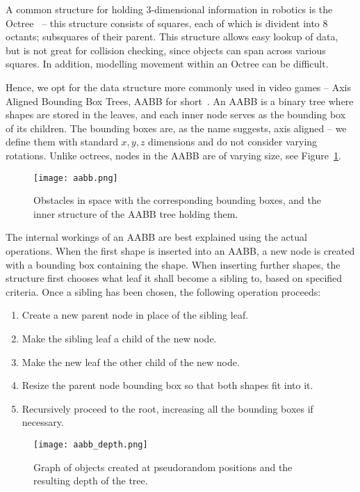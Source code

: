 A common structure for holding 3-dimensional information in robotics is the Octree~\cite{octree} -- this structure consists of squares, each of which is divident into 8 octants; subsquares of their parent. This structure allows easy lookup of data, but is not great for collision checking, since objects can span across various squares. In addition, modelling movement within an Octree can be difficult.

Hence, we opt for the data structure more commonly used in video games -- Axis Aligned Bounding Box Trees, AABB for short~\cite{aabb}. An AABB is a binary tree where shapes are stored in the leaves, and each inner node serves as the bounding box of its children. The bounding boxes are, as the name suggests, axis aligned -- we define them with standard $x, y, z$ dimensions and do not consider varying rotations. Unlike octrees, nodes in the AABB are of varying size, see Figure~\ref{fig:aabb}.

\begin{figure}
  \centering
  \texttt{[image: aabb.png]}
  \caption{Obstacles in space with the corresponding bounding boxes, and the inner structure of the AABB tree holding them.}\label{fig:aabb}
\end{figure}

The internal workings of an AABB are best explained using the actual operations. When the first shape is inserted into an AABB, a new node is created with a bounding box containing the shape. When inserting further shapes, the structure first chooses what leaf it shall become a sibling to, based on specified criteria.
Once a sibling has been chosen, the following operation proceeds:

\begin{enumerate}
\item Create a new parent node in place of the sibling leaf.
\item Make the sibling leaf a child of the new node.
\item Make the new leaf the other child of the new node.
\item Resize the parent node bounding box so that both shapes fit into it.
\item Recursively proceed to the root, increasing all the bounding boxes if necessary.
\end{enumerate}

\begin{figure}
  \centering
  \texttt{[image: aabb\_depth.png]}
  \caption{Graph of objects created at pseudorandom positions and the resulting depth of the tree.}\label{fig:aabb_depth}
\end{figure}

